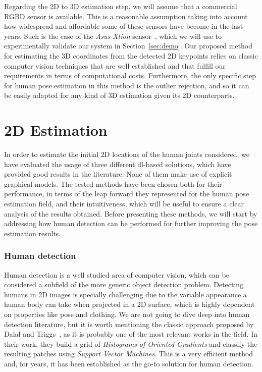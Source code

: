 Regarding the 2D to 3D estimation step, we will assume that a commercial RGBD sensor is available. This is a reasonable assumption taking into account how widespread and affordable some of these sensors have become in the last years. Such is the case of the \emph{Asus Xtion} sensor~\cite{xtion}, which we will use to experimentally validate our system in Section~\ref{sec:demo}. Our proposed method for estimating the 3D coordinates from the detected 2D keypoints relies on classic computer vision techniques that are well established and that fulfill our requirements in terms of computational costs. Furthermore, the only specific step for human pose estimation in this method is the outlier rejection, and so it can be easily adapted for any kind of 3D estimation given its 2D counterparts.

\section{2D Estimation}\label{sec:2d_estimation}
In order to estimate the initial 2D locations of the human joints considered, we have evaluated the usage of three different \gls{dl}-based solutions, which have provided good results in the literature. None of them make use of explicit graphical models. The tested methods have been chosen both for their performance, in terms of the leap forward they represented for the human pose estimation field, and their intuitiveness, which will be useful to ensure a clear analysis of the results obtained. Before presenting these methods, we will start by addressing how human detection can be performed for further improving the pose estimation results.

\subsubsection{Human detection}\label{subsubsec:human_detection}
Human detection is a well studied area of computer vision, which can be considered a subfield of the more generic object detection problem. Detecting humans in 2D images is specially challenging due to the variable appearance a human body can take when projected in a 2D surface, which is highly dependent on properties like pose and clothing. We are not going to dive deep into human detection literature, but it is worth mentioning the classic approach proposed by Dalal and Triggs~\cite{dalal2005histograms}, as it is probably one of the most relevant works in the field. In their work, they build a grid of \emph{Histograms of Oriented Gradients} and classify the resulting patches using \emph{Support Vector Machines}. This is a very efficient method and, for years, it has been established as the go-to solution for human detection.

